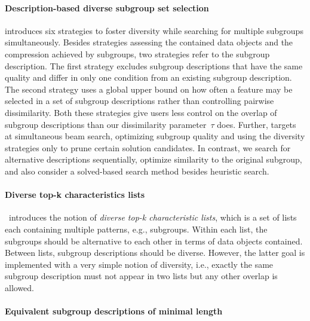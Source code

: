 \documentclass{article}
\theoremstyle{definition}
\begin{document}
\paragraph{Description-based diverse subgroup set selection}

\cite{leeuwen2012diverse} introduces six strategies to foster diversity while searching for multiple subgroups simultaneously.
Besides strategies assessing the contained data objects and the compression achieved by subgroups, two strategies refer to the subgroup description.
The first strategy excludes subgroup descriptions that have the same quality and differ in only one condition from an existing subgroup description.
The second strategy uses a global upper bound on how often a feature may be selected in a set of subgroup descriptions rather than controlling pairwise dissimilarity.
Both these strategies give users less control on the overlap of subgroup descriptions than our dissimilarity parameter~$\tau$ does.
Further, \cite{leeuwen2012diverse} targets at simultaneous beam search, optimizing subgroup quality and using the diversity strategies only to prune certain solution candidates.
In contrast, we search for alternative descriptions sequentially, optimize similarity to the original subgroup, and also consider a solved-based search method besides heuristic search.

\paragraph{Diverse top-k characteristics lists}

\cite{lopez2023discovering}~introduces the notion of \emph{diverse top-k characteristic lists}, which is a set of lists each containing multiple patterns, e.g., subgroups.
Within each list, the subgroups should be alternative to each other in terms of data objects contained.
Between lists, subgroup descriptions should be diverse.
However, the latter goal is implemented with a very simple notion of diversity, i.e., exactly the same subgroup description must not appear in two lists but any other overlap is allowed.

\paragraph{Equivalent subgroup descriptions of minimal length}
\end{document}
